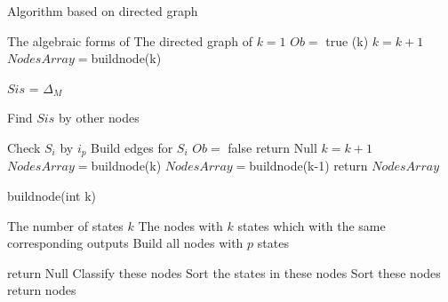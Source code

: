 \begin{algorithm}[h]
\caption{Algorithm based on directed graph}
\begin{algorithmic}[1]
\REQUIRE 
The algebraic forms of \BCN
\ENSURE  
The directed graph of \BCN
\STATE  $k=1$ %
\STATE  $Ob=$ true %
(k)
\STATE $k= k+1$
\STATE $NodesArray=${\sf buildnode}(k)

\STATE $Sis$ = $\Delta_M$ 
\ELSE

\STATE Find $Sis$ by other nodes

\ENDIF
{}
\STATE Check $S_i$ by $i_p$
\STATE Build edges for $S_i$ 
\ENDFOR
{}
\STATE  $Ob=$ false 
\STATE return Null
\ENDIF
\ENDFOR
\STATE $k= k+1$
\STATE $NodesArray=${\sf buildnode}(k)
\ENDWHILE
\STATE $NodesArray=${\sf buildnode}(k-1)
\STATE return $NodesArray$
\end{algorithmic}
 \label{alg:1}
\end{algorithm}
\begin{algorithm}[h!]
\caption{{\sf buildnode}(int k)}
\begin{algorithmic}[1]
\REQUIRE 
The number of states $k$
\ENSURE  
The nodes with $k$ states which with the same corresponding outputs %
\STATE  Build all nodes with $p$ states %

\STATE  return Null
\ELSE 
\STATE  Classify these nodes
\STATE Sort the states in these nodes
\STATE Sort these nodes%
\STATE return nodes
\ENDIF 
\end{algorithmic}
 \label{alg:2}
\end{algorithm}

